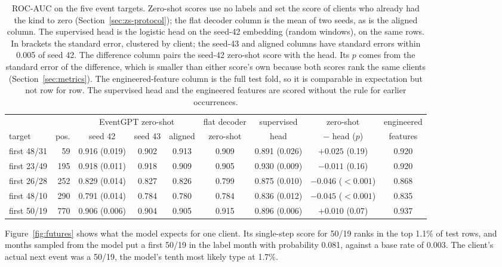 \documentclass[12pt]{article}
\begin{document}
\begin{table}[htbp]
\centering
\caption{ROC-AUC on the five event targets. Zero-shot scores use no labels and set the score of clients who already had the kind to zero (Section~\ref{sec:zs-protocol}); the flat decoder column is the mean of two seeds, as is the aligned column. The supervised head is the logistic head on the seed-42 embedding (random windows), on the same rows. In brackets the standard error, clustered by client; the seed-43 and aligned columns have standard errors within 0.005 of seed 42. The difference column pairs the seed-42 zero-shot score with the head. Its $p$ comes from the standard error of the difference, which is smaller than either score's own because both scores rank the same clients (Section~\ref{sec:metrics}). The engineered-feature column is the full test fold, so it is comparable in expectation but not row for row. The supervised head and the engineered features are scored without the rule for earlier occurrences.}
\label{tab:zero-shot}
\footnotesize
\setlength{\tabcolsep}{2.5pt}
\begin{tabular}{lrccccccc}
\toprule
 & & \multicolumn{3}{c}{EventGPT zero-shot} & flat decoder & supervised & zero-shot & engineered \\
target & pos. & seed 42 & seed 43 & aligned & zero-shot & head & $-$ head ($p$) & features \\
\midrule
first 48/31 & 59 & 0.916 (0.019) & 0.902 & 0.913 & 0.909 & 0.891 (0.026) & $+0.025$ (0.19) & 0.920 \\
first 23/49 & 195 & 0.918 (0.011) & 0.918 & 0.909 & 0.905 & 0.930 (0.009) & $-0.011$ (0.16) & 0.920 \\
first 26/28 & 252 & 0.829 (0.014) & 0.827 & 0.826 & 0.799 & 0.875 (0.010) & $-0.046$ ($<0.001$) & 0.868 \\
first 48/10 & 290 & 0.791 (0.014) & 0.784 & 0.780 & 0.784 & 0.836 (0.012) & $-0.045$ ($<0.001$) & 0.835 \\
first 50/19 & 770 & 0.906 (0.006) & 0.904 & 0.905 & 0.915 & 0.896 (0.006) & $+0.010$ (0.07) & 0.937 \\
\bottomrule
\end{tabular}
\end{table}

Figure~\ref{fig:futures} shows what the model expects for one client. Its single-step score for 50/19 ranks in the top 1.1\% of test rows, and months sampled from the model put a first 50/19 in the label month with probability 0.081, against a base rate of 0.003. The client's actual next event was a 50/19, the model's tenth most likely type at 1.7\%.
\end{document}
